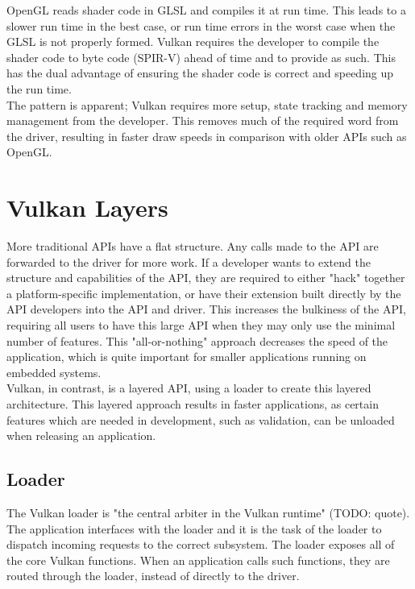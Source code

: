 \documentclass[12pt]{report}
\theoremstyle{definition}
\begin{document}
      OpenGL reads shader code in GLSL and compiles it at run time. This leads
      to a slower run time in the best case, or run time errors in the worst
      case when the GLSL is not properly formed. Vulkan requires the developer
      to compile the shader code to byte code (SPIR-V) ahead of time and to
      provide as such. This has the dual advantage of ensuring the shader
      code is correct and speeding up the run time. \\

      The pattern is apparent; Vulkan requires more setup, state tracking and
      memory management from the developer. This removes much of the required
      word from the driver, resulting in faster draw speeds in comparison
      with older APIs such as OpenGL.

    \section{Vulkan Layers}

      More traditional APIs have a flat structure. Any calls made to the API are
      forwarded to the driver for more work. If a developer wants to extend the
      structure and capabilities of the API, they are required to either "hack"
      together a platform-specific implementation, or have their extension
      built directly by the API developers into the API and driver. This
      increases the bulkiness of the API, requiring all users to have
      this large API when they may only use the minimal number of features.
      This "all-or-nothing" approach decreases the speed of the application,
      which is quite important for smaller applications running on embedded
      systems. \\

      Vulkan, in contrast, is a layered API, using a loader to create this
      layered architecture. This layered approach results in faster
      applications, as certain features which are needed in development,
      such as validation, can be unloaded when releasing an application.

      \subsection{Loader}

      The Vulkan loader is "the central arbiter in the Vulkan runtime" (TODO: quote).
      The application interfaces with the loader and it is the task of the
      loader to dispatch incoming requests to the correct subsystem. The
      loader exposes all of the core Vulkan functions. When an application
      calls such functions, they are routed through the loader, instead of
      directly to the driver. \\
\end{document}
